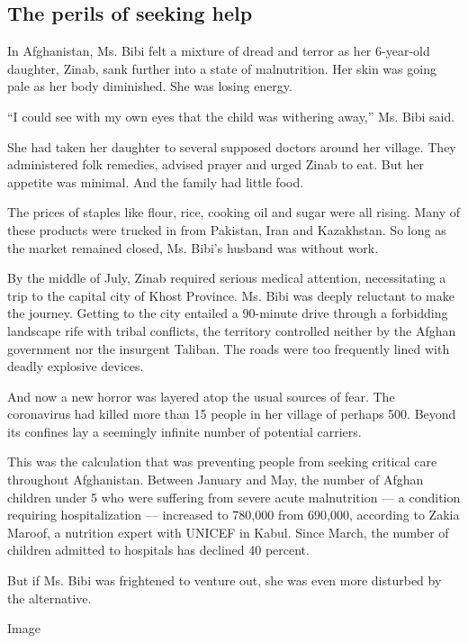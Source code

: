 \hypertarget{the-perils-of-seeking-help}{%
\subsection{The perils of seeking
help}\label{the-perils-of-seeking-help}}

In Afghanistan, Ms. Bibi felt a mixture of dread and terror as her
6-year-old daughter, Zinab, sank further into a state of malnutrition.
Her skin was going pale as her body diminished. She was losing energy.

``I could see with my own eyes that the child was withering away,'' Ms.
Bibi said.

She had taken her daughter to several supposed doctors around her
village. They administered folk remedies, advised prayer and urged Zinab
to eat. But her appetite was minimal. And the family had little food.

The prices of staples like flour, rice, cooking oil and sugar were all
rising. Many of these products were trucked in from Pakistan, Iran and
Kazakhstan. So long as the market remained closed, Ms. Bibi's husband
was without work.

By the middle of July, Zinab required serious medical attention,
necessitating a trip to the capital city of Khost Province. Ms. Bibi was
deeply reluctant to make the journey. Getting to the city entailed a
90-minute drive through a forbidding landscape rife with tribal
conflicts, the territory controlled neither by the Afghan government nor
the insurgent Taliban. The roads were too frequently lined with deadly
explosive devices.

And now a new horror was layered atop the usual sources of fear. The
coronavirus had killed more than 15 people in her village of perhaps
500. Beyond its confines lay a seemingly infinite number of potential
carriers.

This was the calculation that was preventing people from seeking
critical care throughout Afghanistan. Between January and May, the
number of Afghan children under 5 who were suffering from severe acute
malnutrition --- a condition requiring hospitalization --- increased to
780,000 from 690,000, according to Zakia Maroof, a nutrition expert with
UNICEF in Kabul. Since March, the number of children admitted to
hospitals has declined 40 percent.

But if Ms. Bibi was frightened to venture out, she was even more
disturbed by the alternative.

Image

